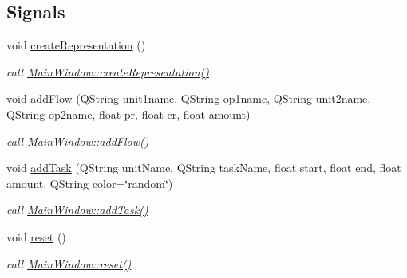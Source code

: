 \subsection*{Signals}
\begin{DoxyCompactItemize}
\item 
\hypertarget{class_wizard_a196e8f8b6c8f346fe869d7f01c2d7ab5}{}void \hyperlink{class_wizard_a196e8f8b6c8f346fe869d7f01c2d7ab5}{create\+Representation} ()\label{class_wizard_a196e8f8b6c8f346fe869d7f01c2d7ab5}

\begin{DoxyCompactList}\small\item\em call \hyperlink{class_main_window_a0b3d1510d0e0ed665daa74d6823e00d6}{Main\+Window\+::create\+Representation()} \end{DoxyCompactList}\item 
\hypertarget{class_wizard_a6f7b8a79c893099e99100bb0c3c67be4}{}void \hyperlink{class_wizard_a6f7b8a79c893099e99100bb0c3c67be4}{add\+Flow} (Q\+String unit1name, Q\+String op1name, Q\+String unit2name, Q\+String op2name, float pr, float cr, float amount)\label{class_wizard_a6f7b8a79c893099e99100bb0c3c67be4}

\begin{DoxyCompactList}\small\item\em call \hyperlink{class_main_window_a645f1cd085c2636dc4eccb320455a6f4}{Main\+Window\+::add\+Flow()} \end{DoxyCompactList}\item 
\hypertarget{class_wizard_a7a17fda2d9854c8461234417c634ec32}{}void \hyperlink{class_wizard_a7a17fda2d9854c8461234417c634ec32}{add\+Task} (Q\+String unit\+Name, Q\+String task\+Name, float start, float end, float amount, Q\+String color=\char`\"{}random\char`\"{})\label{class_wizard_a7a17fda2d9854c8461234417c634ec32}

\begin{DoxyCompactList}\small\item\em call \hyperlink{class_main_window_a2920d5c6c64925cb5f87c7fdac3f54b0}{Main\+Window\+::add\+Task()} \end{DoxyCompactList}\item 
\hypertarget{class_wizard_ae2efd036bcfcaa60c865fed1bec603bd}{}void \hyperlink{class_wizard_ae2efd036bcfcaa60c865fed1bec603bd}{reset} ()\label{class_wizard_ae2efd036bcfcaa60c865fed1bec603bd}

\begin{DoxyCompactList}\small\item\em call \hyperlink{class_main_window_a02076de46e6810174817ebfc6ddd2be5}{Main\+Window\+::reset()} \end{DoxyCompactList}\end{DoxyCompactItemize}
